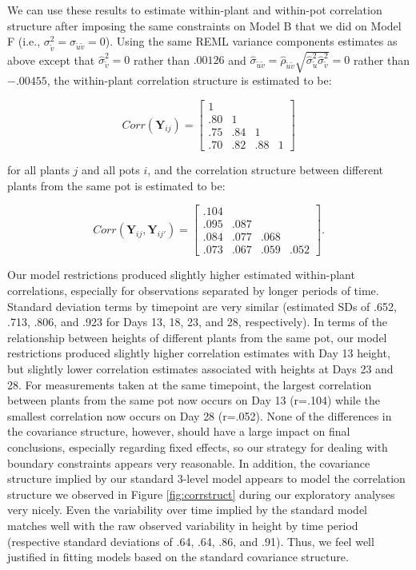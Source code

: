 \documentclass[
]{krantz}
\begin{document}
We can use these results to estimate within-plant and within-pot correlation structure after imposing the same constraints on Model B that we did on Model F (i.e., \(\sigma_{\tilde{v}}^{2}=\sigma_{\tilde{u}\tilde{v}}=0\)). Using the same REML variance components estimates as above except that \(\hat{\sigma}_{\tilde{v}}^{2}=0\) rather than \(.00126\) and \(\hat{\sigma}_{\tilde{u}\tilde{v}}=\hat{\rho}_{\tilde{u}\tilde{v}}\sqrt{\hat{\sigma}_{\tilde{u}}^{2}\hat{\sigma}_{\tilde{v}}^{2}}=0\) rather than \(-.00455\), the within-plant correlation structure is estimated to be:

\[  Corr(\textbf{Y}_{ij}) = \left[
          \begin{array}{cccc}
            1 & & & \\
            .80 & 1 & & \\
            .75 & .84 & 1 & \\
            .70 & .82 & .88 & 1
          \end{array} \right] \]

for all plants \(j\) and all pots \(i\), and the correlation structure between different plants from the same pot is estimated to be:

\[  Corr(\textbf{Y}_{ij},\textbf{Y}_{ij'}) = \left[
          \begin{array}{cccc}
            .104 & & & \\
            .095 & .087 & & \\
            .084 & .077 & .068 & \\
            .073 & .067 & .059 & .052
          \end{array} \right]. \]

Our model restrictions produced slightly higher estimated within-plant correlations, especially for observations separated by longer periods of time. Standard deviation terms by timepoint are very similar (estimated SDs of .652, .713, .806, and .923 for Days 13, 18, 23, and 28, respectively). In terms of the relationship between heights of different plants from the same pot, our model restrictions produced slightly higher correlation estimates with Day 13 height, but slightly lower correlation estimates associated with heights at Days 23 and 28. For measurements taken at the same timepoint, the largest correlation between plants from the same pot now occurs on Day 13 (r=.104) while the smallest correlation now occurs on Day 28 (r=.052). None of the differences in the covariance structure, however, should have a large impact on final conclusions, especially regarding fixed effects, so our strategy for dealing with boundary constraints appears very reasonable. In addition, the covariance structure implied by our standard 3-level model appears to model the correlation structure we observed in Figure \ref{fig:corrstruct} during our exploratory analyses very nicely. Even the variability over time implied by the standard model matches well with the raw observed variability in height by time period (respective standard deviations of .64, .64, .86, and .91). Thus, we feel well justified in fitting models based on the standard covariance structure.
\end{document}
